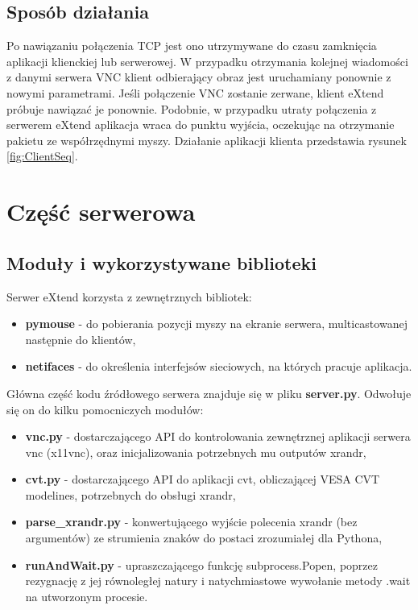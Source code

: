   \subsection{Sposób działania}


    Po nawiązaniu połączenia TCP jest ono utrzymywane do czasu zamknięcia aplikacji klienckiej lub serwerowej. W przypadku otrzymania kolejnej wiadomości z danymi serwera VNC klient odbierający obraz jest uruchamiany ponownie z nowymi parametrami. Jeśli połączenie VNC zostanie zerwane, klient eXtend próbuje nawiązać je ponownie. Podobnie, w przypadku utraty połączenia z serwerem eXtend aplikacja wraca do punktu wyjścia, oczekując na otrzymanie pakietu ze współrzędnymi myszy.
    Działanie aplikacji klienta przedstawia rysunek \ref{fig:ClientSeq}.

\section{Część serwerowa}

  \subsection{Moduły i wykorzystywane biblioteki}

    Serwer eXtend korzysta z zewnętrznych bibliotek:

    \begin{itemize}
      \item \textbf{pymouse} \cite{PyUserInput} - do pobierania pozycji myszy na ekranie serwera, multicastowanej następnie do klientów,
      \item \textbf{netifaces} \cite{Netifaces} - do określenia interfejsów sieciowych, na których pracuje aplikacja.
    \end{itemize}

    Główna część kodu źródłowego serwera znajduje się w pliku \textbf{server.py}. Odwołuje się on do kilku pomocniczych modułów:

    \begin{itemize}
      \item \textbf{vnc.py} - dostarczającego API do kontrolowania zewnętrznej aplikacji serwera vnc (x11vnc), oraz inicjalizowania potrzebnych mu outputów xrandr,
      \item \textbf{cvt.py} - dostarczającego API do aplikacji cvt, obliczającej VESA CVT modelines, potrzebnych do obsługi xrandr,
      \item \textbf{parse\_xrandr.py} - konwertującego wyjście polecenia xrandr (bez argumentów) ze strumienia znaków do postaci zrozumiałej dla Pythona,
      \item \textbf{runAndWait.py} - upraszczającego funkcję subprocess.Popen, poprzez rezygnację z jej równoległej natury i natychmiastowe wywołanie metody .wait na utworzonym procesie.
    \end{itemize}

